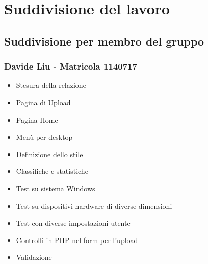 \documentclass[openany, a4paper, 12pt]{report}
\begin{document}
	\chapter{Suddivisione del lavoro}
	\section{Suddivisione per membro del gruppo}
	\subsection{Davide Liu - Matricola 1140717}
	\begin{itemize}
		\item Stesura della relazione
		\item Pagina di Upload
		\item Pagina Home
		\item Menù per desktop
		\item Definizione dello stile
		\item Classifiche e statistiche
		\item Test su sistema Windows
		\item Test su dispositivi hardware di diverse
		 dimensioni
		\item Test con diverse impostazioni utente
		\item Controlli in PHP nel form per l'upload
		\item Validazione
	\end{itemize}
\end{document}
